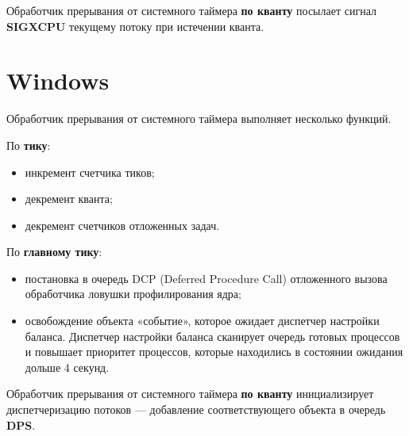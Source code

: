 Обработчик прерывания от системного таймера \textbf{по кванту} посылает сигнал \textbf{SIGXCPU} текущему потоку при истечении кванта.

\section{Windows}

Обработчик прерывания от системного таймера выполняет несколько функций.

По \textbf{тику}:
\begin{itemize}
	\item инкремент счетчика тиков;
	\item декремент кванта;
	\item декремент счетчиков отложенных задач.
\end{itemize}

По \textbf{главному тику}:
\begin{itemize}
	\item постановка в очередь DCP (Deferred Procedure Call) отложенного вызова обработчика ловушки профилирования ядра;
	\item освобождение объекта «событие», которое ожидает диспетчер настройки баланса. Диспетчер настройки баланса сканирует очередь готовых процессов и повышает приоритет процессов, которые находились в состоянии ожидания дольше 4 секунд.
\end{itemize}

Обработчик прерывания от системного таймера \textbf{по кванту} инициализирует диспетчеризацию потоков --- добавление соответствующего объекта в очередь \textbf{DPS}.